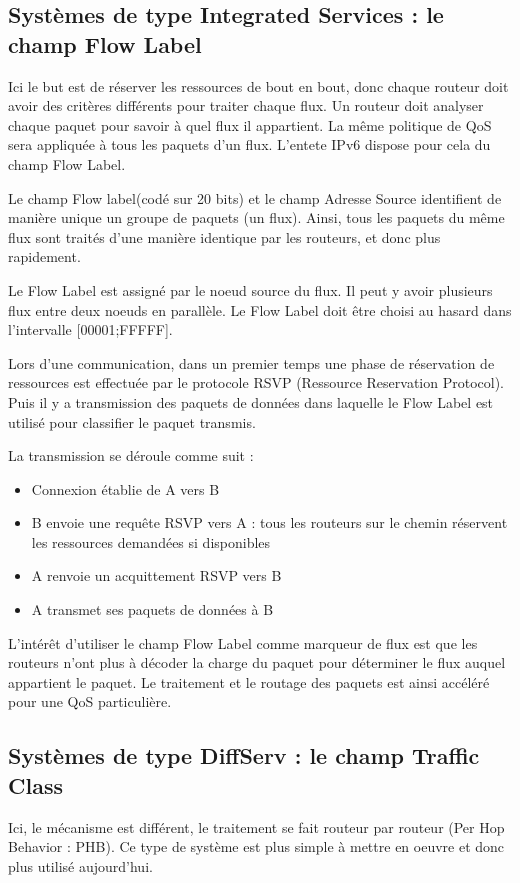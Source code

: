 \subsection{Systèmes de type Integrated Services : le champ Flow Label}
Ici le but est de réserver les ressources de bout en bout, donc chaque routeur doit avoir des critères différents pour traiter chaque flux. Un routeur doit analyser chaque paquet pour savoir à quel flux il appartient. La même politique de QoS sera appliquée à tous les paquets d'un flux. L'entete IPv6 dispose pour cela du champ Flow Label.

    Le champ Flow label(codé sur 20 bits) et le champ Adresse Source identifient de manière unique un groupe de paquets (un flux). Ainsi, tous les paquets du même flux sont traités d'une manière identique par les routeurs, et donc plus rapidement.  
    
    Le Flow Label est assigné par le noeud source du flux. Il peut y avoir plusieurs flux entre deux noeuds en parallèle. Le Flow Label doit être choisi au hasard dans l'intervalle [00001;FFFFF].
    
    Lors d'une communication, dans un premier temps une phase de réservation de ressources est effectuée par le protocole RSVP (Ressource Reservation Protocol). Puis il y a transmission des paquets de données dans laquelle le Flow Label est utilisé pour classifier le paquet transmis.
    
    La transmission se déroule comme suit : 
    \begin{itemize}
    \item Connexion établie de A vers B
    \item B envoie une requête RSVP vers A : tous les routeurs sur le chemin réservent les ressources demandées si disponibles
    \item A renvoie un acquittement RSVP vers B
    \item A transmet ses paquets de données à B
    \end{itemize}

	L'intérêt d'utiliser le champ Flow Label comme marqueur de flux est que les routeurs n'ont plus à décoder la charge du paquet pour déterminer le flux auquel appartient le paquet. Le traitement et le routage des paquets est ainsi accéléré pour une QoS particulière.
    
\subsection{Systèmes de type DiffServ : le champ Traffic Class}
	Ici, le mécanisme est différent, le traitement se fait routeur par routeur (Per Hop Behavior : PHB). Ce type de système est plus simple à mettre en oeuvre et donc plus utilisé aujourd'hui.
    
